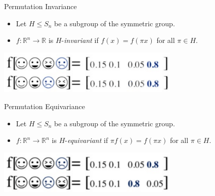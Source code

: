 \documentclass{beamer}
\begin{document}
\begin{frame}{Permutation Invariance}

    \begin{itemize}
        \setlength{\itemsep}{\fill}
        \item Let $H \leq S_n$ be a subgroup of the symmetric group.
        \item $f:\mathbb{R}^n \rightarrow \mathbb{R}$ is $H$-\textit{invariant} if $f(x) = f(\pi x)$ for all $\pi \in H$.
    \end{itemize}
    \begin{center}
        \includegraphics[width=0.65\textwidth]{../figures/perm_in.png}
    \end{center}
    
\end{frame}



\begin{frame}{Permutation Equivariance}

    \begin{itemize}
        \setlength{\itemsep}{\fill}
        \item Let $H \leq S_n$ be a subgroup of the symmetric group.
        \item $f:\mathbb{R}^n \rightarrow \mathbb{R}^n$ is $H$-\textit{equivariant} if $\pi f(x) = f(\pi x)$ for all $\pi \in H$.
    \end{itemize}
    \begin{center}
        \includegraphics[width=0.65\textwidth]{../figures/perm_eq.png}
    \end{center}
    
\end{frame}
\end{document}
